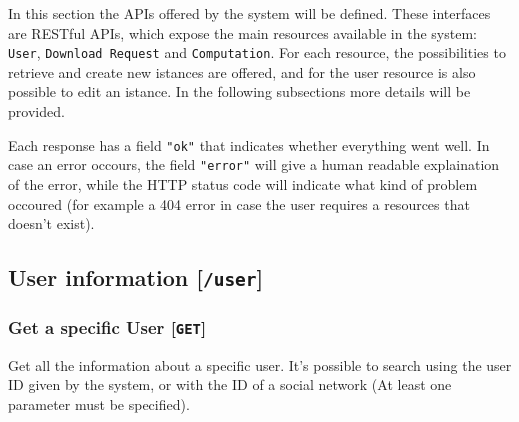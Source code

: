 In this section the APIs offered by the system will be defined. These interfaces are RESTful APIs, which expose the main resources available in the system: \texttt{User}, \texttt{Download Request} and \texttt{Computation}. For each resource, the possibilities to retrieve and create new istances are offered, and for the user resource is also possible to edit an istance. In the following subsections more details will be provided. 

Each response has a field \texttt{"ok"} that indicates whether everything went well. In case an error occours, the field \texttt{"error"} will give a human readable explaination of the error, while the HTTP status code will indicate what kind of problem occoured (for example a 404 error in case the user requires a resources that doesn't exist).

\subsection{User information {[}\protect\texttt{/user}{]}}
\label{sec:APIuser}

\subsubsection{Get a specific User {[}\protect\texttt{GET}{]}}

Get all the information about a specific user. It's possible to search using the user ID given by the system, or with the ID of a social network (At least one parameter must be specified).

